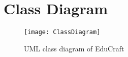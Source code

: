 \chapter{Class Diagram}
\label{apdx:class-diagram}

\begin{landscape}
\begin{figure}[H]
\label{fig:class-diagram}
\caption{UML class diagram of EduCraft}
\centering
\texttt{[image: ClassDiagram]}
\end{figure}
\end{landscape}
